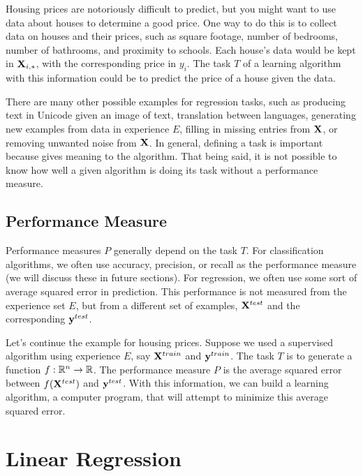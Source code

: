 \begin{example}
Housing prices are notoriously difficult to predict, but you might want to use data about houses to determine a good price. One way to do this is to collect data on houses and their prices, such as square footage, number of bedrooms, number of bathrooms, and proximity to schools. Each house's data would be kept in $\MX_{i,\ast}$, with the corresponding price in $y_i$. The task $T$ of a learning algorithm with this information could be to predict the price of a house given the data.
\end{example}

There are many other possible examples for regression tasks, such as producing text in Unicode given an image of text, translation between languages, generating new examples from data in experience $E$, filling in missing entries from $\MX$, or removing unwanted noise from $\MX$. In general, defining a task is important because gives meaning to the algorithm. That being said, it is not possible to know how well a given algorithm is doing its task without a performance measure.

\subsection{Performance Measure}

Performance measures $P$ generally depend on the task $T$. For classification algorithms, we often use accuracy, precision, or recall as the performance measure (we will discuss these in future sections). For regression, we often use some sort of average squared error in prediction. This performance is not measured from the experience set $E$, but from a different set of examples, $\MX^{test}$ and the corresponding $\vy^{test}$.

\begin{example}
Let's continue the example for housing prices. Suppose we used a supervised algorithm using experience $E$, say $\MX^{train}$ and $\vy^{train}$. The task $T$ is to generate a function $f : \R^n \to \R$. The performance measure $P$ is the average squared error between $f(\MX^{test})$ and $\vy^{test}$. With this information, we can build a learning algorithm, a computer program, that will attempt to minimize this average squared error.
\end{example}

\section{Linear Regression}

